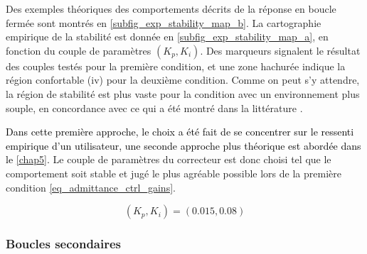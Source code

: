 Des exemples théoriques des comportements décrits de la réponse en boucle fermée sont montrés en \cref{subfig_exp_stability_map_b}. La cartographie empirique de la stabilité est donnée en \cref{subfig_exp_stability_map_a}, en fonction du couple de paramètres $ (K_p, K_i) $. Des marqueurs signalent le résultat des couples testés pour la première condition, et une zone hachurée indique la région confortable (iv) pour la deuxième condition. Comme on peut s'y attendre, la région de stabilité est plus vaste pour la condition avec un environnement plus souple, en concordance avec ce qui a été montré dans la littérature \parencite{ott_unified_2010,keemink_admittance_2018}. 

\textcolor{black}{Dans cette première approche, le choix a été fait de se concentrer sur le ressenti empirique d'un utilisateur, une seconde approche plus théorique est abordée dans le \cref{chap5}.} Le couple de paramètres du correcteur est donc choisi tel que le comportement soit stable et jugé le plus agréable possible lors de la première condition \cref{eq_admittance_ctrl_gains}.

\begin{equation} \label{eq_admittance_ctrl_gains}
	(K_p, K_i) = (0.015, 0.08)
\end{equation}


%

%
\subsubsection{Boucles secondaires} \label{sec_robot_sub_task_ctrl_tunning_2}

